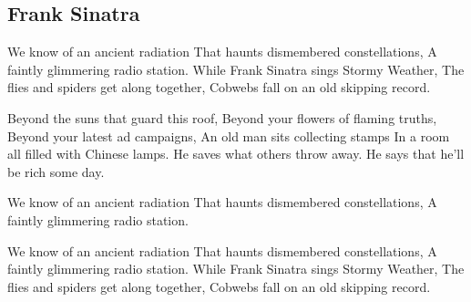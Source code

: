 \subsection*{Frank Sinatra   }
\begin{guitar}
We know of an ancient radiation
That haunts dismembered constellations,
A faintly glimmering radio station.
While Frank Sinatra sings Stormy Weather,
The flies and spiders get along together,
Cobwebs fall on an old skipping record. 

Beyond the suns that guard this roof,
Beyond your flowers of flaming truths,
Beyond your latest ad campaigns,
An old man sits collecting stamps
In a room all filled with Chinese lamps.
He saves what others throw away.
He says that he'll be rich some day.

We know of an ancient radiation
That haunts dismembered constellations,
A faintly glimmering radio station. 

We know of an ancient radiation
That haunts dismembered constellations,
A faintly glimmering radio station.
While Frank Sinatra sings Stormy Weather,
The flies and spiders get along together,
Cobwebs fall on an old skipping record.

\end{guitar}
